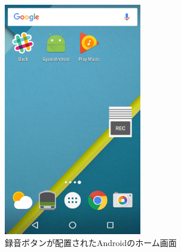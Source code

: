 \begin{figure}[H]
\centering
\includegraphics[width=6cm]{images/home.png}
\caption{録音ボタンが配置されたAndroidのホーム画面}
\label{home}
\end{figure}